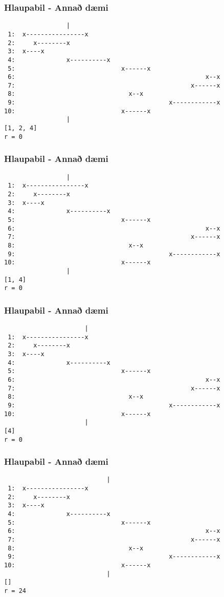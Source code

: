 \documentclass{beamer}
\begin{document}
\begin{frame}[fragile]
	\frametitle{Hlaupabil - Annað dæmi}
\begin{verbatim}
                 |
 1:  x----------------x
 2:     x--------x
 3:  x----x
 4:              x----------x
 5:                             x------x
 6:                                                    x--x
 7:                                                x------x
 8:                               x--x
 9:                                          x------------x
10:                             x------x
                 |
[1, 2, 4]
r = 0
\end{verbatim}
\end{frame}
\addtocounter{framenumber}{-1}

\begin{frame}[fragile]
	\frametitle{Hlaupabil - Annað dæmi}
\begin{verbatim}
                 |
 1:  x----------------x
 2:     x--------x
 3:  x----x
 4:              x----------x
 5:                             x------x
 6:                                                    x--x
 7:                                                x------x
 8:                               x--x
 9:                                          x------------x
10:                             x------x
                 |
[1, 4]
r = 0
\end{verbatim}
\end{frame}
\addtocounter{framenumber}{-1}

\begin{frame}[fragile]
	\frametitle{Hlaupabil - Annað dæmi}
\begin{verbatim}
                      |
 1:  x----------------x
 2:     x--------x
 3:  x----x
 4:              x----------x
 5:                             x------x
 6:                                                    x--x
 7:                                                x------x
 8:                               x--x
 9:                                          x------------x
10:                             x------x
                      |
[4]
r = 0
\end{verbatim}
\end{frame}
\addtocounter{framenumber}{-1}

\begin{frame}[fragile]
	\frametitle{Hlaupabil - Annað dæmi}
\begin{verbatim}
                            |
 1:  x----------------x
 2:     x--------x
 3:  x----x
 4:              x----------x
 5:                             x------x
 6:                                                    x--x
 7:                                                x------x
 8:                               x--x
 9:                                          x------------x
10:                             x------x
                            |
[]
r = 24
\end{verbatim}
\end{frame}
\addtocounter{framenumber}{-1}
\end{document}
